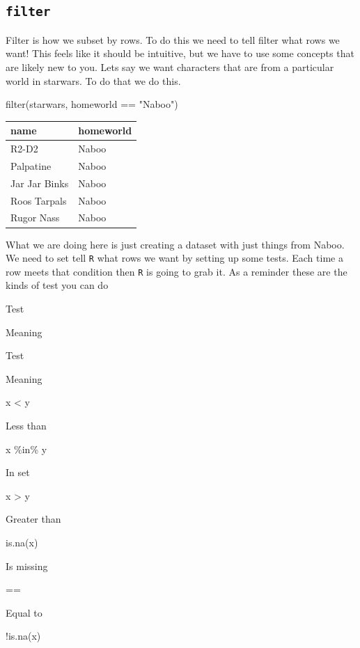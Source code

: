 \documentclass[
  letterpaper,
  DIV=11,
  numbers=noendperiod,
  oneside]{scrreprt}
\newenvironment{Shaded}{\begin{snugshade}}{\end{snugshade}}
\newcommand{\FunctionTok}[1]{\textcolor[rgb]{0.28,0.35,0.67}{#1}}
\newcommand{\NormalTok}[1]{\textcolor[rgb]{0.00,0.23,0.31}{#1}}
\newcommand{\SpecialCharTok}[1]{\textcolor[rgb]{0.37,0.37,0.37}{#1}}
\newcommand{\StringTok}[1]{\textcolor[rgb]{0.13,0.47,0.30}{#1}}
\begin{document}
\hypertarget{filter}{%
\subsection{\texorpdfstring{\texttt{filter}}{filter}}\label{filter}}

Filter is how we subset by rows. To do this we need to tell filter what
rows we want! This feels like it should be intuitive, but we have to use
some concepts that are likely new to you. Lets say we want characters
that are from a particular world in starwars. To do that we do this.

\begin{Shaded}
\begin{Highlighting}[]
\FunctionTok{filter}\NormalTok{(starwars, homeworld }\SpecialCharTok{==} \StringTok{"Naboo"}\NormalTok{) }
\end{Highlighting}
\end{Shaded}

\begin{tabular}{l|l}
\hline
name & homeworld\\
\hline
R2-D2 & Naboo\\
\hline
Palpatine & Naboo\\
\hline
Jar Jar Binks & Naboo\\
\hline
Roos Tarpals & Naboo\\
\hline
Rugor Nass & Naboo\\
\hline
\end{tabular}

What we are doing here is just creating a dataset with just things from
Naboo. We need to set tell \texttt{R} what rows we want by setting up
some tests. Each time a row meets that condition then \texttt{R} is
going to grab it. As a reminder these are the kinds of test you can do

Test

Meaning

Test

Meaning

x \textless{} y

Less than

x \%in\% y

In set

x \textgreater{} y

Greater than

is.na(x)

Is missing

==

Equal to

!is.na(x)
\end{document}
